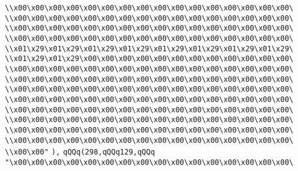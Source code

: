 \verb|\\x00\x00\x00\x00\x00\x00\x00\x00\x00\x00\x00\x00\x00\x00\x00\x00\|\newline
\verb|\\x00\x00\x00\x00\x00\x00\x00\x00\x00\x00\x00\x00\x00\x00\x00\x00\|\newline
\verb|\\x00\x00\x00\x00\x00\x00\x00\x00\x00\x00\x00\x00\x00\x00\x00\x00\|\newline
\verb|\\x00\x00\x00\x00\x00\x00\x00\x00\x00\x00\x00\x00\x00\x00\x00\x00\|\newline
\verb|\\x01\x29\x01\x29\x01\x29\x01\x29\x01\x29\x01\x29\x01\x29\x01\x29\|\newline
\verb|\\x01\x29\x01\x29\x00\x00\x00\x00\x00\x00\x00\x00\x00\x00\x00\x00\|\newline
\verb|\\x00\x00\x00\x00\x00\x00\x00\x00\x00\x00\x00\x00\x00\x00\x00\x00\|\newline
\verb|\\x00\x00\x00\x00\x00\x00\x00\x00\x00\x00\x00\x00\x00\x00\x00\x00\|\newline
\verb|\\x00\x00\x00\x00\x00\x00\x00\x00\x00\x00\x00\x00\x00\x00\x00\x00\|\newline
\verb|\\x00\x00\x00\x00\x00\x00\x00\x00\x00\x00\x00\x00\x00\x00\x00\x00\|\newline
\verb|\\x00\x00\x00\x00\x00\x00\x00\x00\x00\x00\x00\x00\x00\x00\x00\x00\|\newline
\verb|\\x00\x00\x00\x00\x00\x00\x00\x00\x00\x00\x00\x00\x00\x00\x00\x00\|\newline
\verb|\\x00\x00\x00\x00\x00\x00\x00\x00\x00\x00\x00\x00\x00\x00\x00\x00\|\newline
\verb|\\x00\x00\x00\x00\x00\x00\x00\x00\x00\x00\x00\x00\x00\x00\x00\x00\|\newline
\verb|\\x00\x00"|\newline
\verb|),|\newline
\verb|qQQq(298,qQQq129,qQQq|\newline
\verb|"\x00\x00\x00\x00\x00\x00\x00\x00\x00\x00\x00\x00\x00\x00\x00\x00\|\newline
